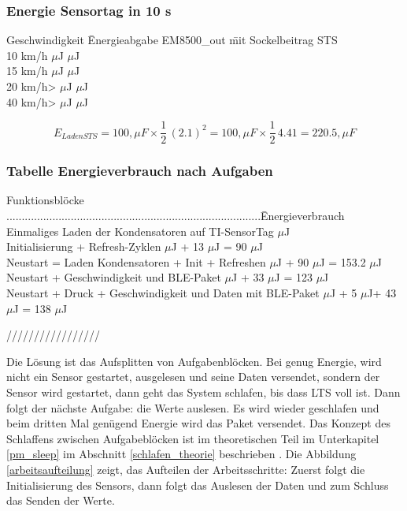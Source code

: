 \subsubsection*{Energie Sensortag in 10 s}
\begin{tabbing}
    Geschwindigkeit \quad\= Energieabgabe EM8500\_out  \quad\= mit Sockelbeitrag STS\\[0.8ex]
    10 km/h         $\mu$J          $\mu$J\\
    15 km/h        $\mu$J          $\mu$J\\
    20 km/h>       $\mu$J          $\mu$J\\
    40 km/h>      $\mu$J         $\mu$J\\
\end{tabbing}  

\begin{equation}
  E_{Laden STS}= 100, \mu F \times \frac{1}{2}\, (2.1)^2 = 100, \mu F \times \frac{1}{2}\, 4.41 = 220.5, \mu F
\end{equation}


\subsubsection*{Tabelle Energieverbrauch nach Aufgaben}
\begin{tabbing}
    Funktionsblöcke ...................................................................................\quad\= Energieverbrauch \\[0.8ex]
    Einmaliges Laden der Kondensatoren auf TI-SensorTag         $\mu$J\\
    Initialisierung + Refresh-Zyklen                            $\mu$J + 13 $\mu$J = 90 $\mu$J\\
    Neustart = Laden Kondensatoren + Init + Refreshen           $\mu$J + 90 $\mu$J = 153.2 $\mu$J\\
    Neustart + Geschwindigkeit und BLE-Paket                    $\mu$J + 33 $\mu$J = 123 $\mu$J\\
    Neustart + Druck + Geschwindigkeit und Daten mit BLE-Paket  $\mu$J + 5 $\mu$J+ 43 $\mu$J = 138 $\mu$J\\
\end{tabbing} 


/////////////////


Die Lösung ist das Aufsplitten von Aufgabenblöcken. Bei genug Energie, wird nicht ein Sensor gestartet, ausgelesen und seine Daten versendet, sondern der Sensor wird gestartet, dann geht das System schlafen, bis dass LTS voll ist. Dann folgt der nächste Aufgabe: die Werte auslesen. Es wird wieder geschlafen und beim dritten Mal genügend Energie wird das Paket versendet. Das Konzept des Schlaffens zwischen Aufgabeblöcken ist im theoretischen Teil im Unterkapitel \ref{pm_sleep} im Abschnitt \ref{schlafen_theorie} beschrieben . Die Abbildung \ref{arbeitsaufteilung} zeigt, das Aufteilen der Arbeitsschritte: Zuerst folgt die Initialisierung des Sensors, dann folgt das Auslesen der Daten und zum Schluss das Senden der Werte.


